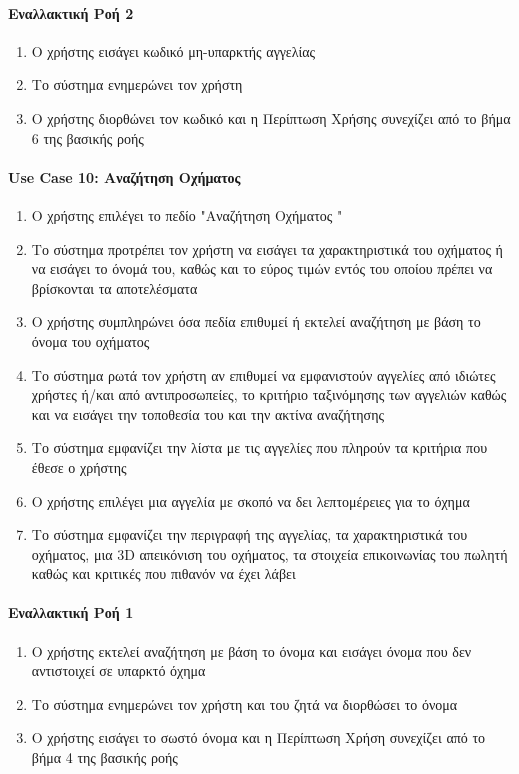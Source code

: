 \documentclass{../ol-softwaremanual}
\begin{document}
	\paragraph{Εναλλακτική Ροή 2}
	\begin{enumerate}
		\item Ο χρήστης εισάγει κωδικό μη-υπαρκτής αγγελίας
		\item Το σύστημα ενημερώνει τον χρήστη
		\item Ο χρήστης διορθώνει τον κωδικό και η Περίπτωση Χρήσης συνεχίζει από το βήμα 6 της βασικής ροής
	\end{enumerate}

	\paragraph{\en Use Case 10: \gr Αναζήτηση Οχήματος}  
\begin{enumerate}
	\item Ο χρήστης επιλέγει το πεδίο \en"\gr Αναζήτηση Οχήματος \en"\gr
	\item Το σύστημα προτρέπει τον χρήστη να εισάγει τα χαρακτηριστικά του οχήματος ή να εισάγει το όνομά του, καθώς και το εύρος τιμών εντός του οποίου πρέπει να βρίσκονται τα αποτελέσματα
	\item Ο χρήστης συμπληρώνει όσα πεδία επιθυμεί ή εκτελεί αναζήτηση με βάση το όνομα του οχήματος
	\item Το σύστημα ρωτά τον χρήστη αν επιθυμεί να εμφανιστούν αγγελίες από ιδιώτες χρήστες ή/και από αντιπροσωπείες, το κριτήριο ταξινόμησης των αγγελιών καθώς και να εισάγει την τοποθεσία του και την ακτίνα αναζήτησης		
	\item Το σύστημα εμφανίζει την λίστα με τις αγγελίες που πληρούν τα κριτήρια που έθεσε ο χρήστης	
	\item Ο χρήστης επιλέγει μια αγγελία με σκοπό να δει λεπτομέρειες για το όχημα
	\item Το σύστημα εμφανίζει την περιγραφή της αγγελίας, τα χαρακτηριστικά του οχήματος, μια \en 3D \gr απεικόνιση του οχήματος, τα στοιχεία επικοινωνίας του πωλητή καθώς και κριτικές που πιθανόν να έχει λάβει		
\end{enumerate}

\paragraph{Εναλλακτική Ροή 1}
\begin{enumerate}
	\item  Ο χρήστης εκτελεί αναζήτηση με βάση το όνομα και εισάγει όνομα που δεν αντιστοιχεί σε υπαρκτό όχημα
	\item Το σύστημα ενημερώνει τον χρήστη και του ζητά να διορθώσει το όνομα
	\item Ο χρήστης εισάγει το σωστό όνομα και η Περίπτωση Χρήση συνεχίζει από το βήμα 4 της βασικής ροής		 
\end{enumerate}
\end{document}
